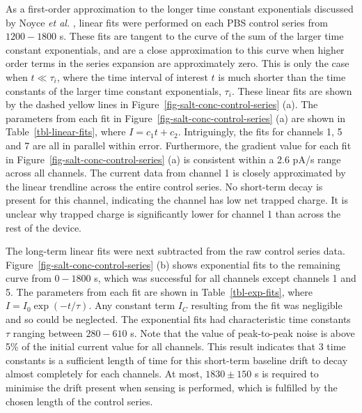 \documentclass[
  a4paper,
]{scrbook}
\begin{document}
As a first-order approximation to the longer time constant exponentials
discussed by Noyce \emph{et al.} \autocite{Noyce2019}, linear fits were
performed on each PBS control series from \(1200-1800\) s. These fits
are tangent to the curve of the sum of the larger time constant
exponentials, and are a close approximation to this curve when higher
order terms in the series expansion are approximately zero. This is only
the case when \(t\ll\tau_i\), where the time interval of interest \(t\)
is much shorter than the time constants of the larger time constant
exponentials, \(\tau_i\). These linear fits are shown by the dashed
yellow lines in Figure~\ref{fig-salt-conc-control-series} (a). The
parameters from each fit in Figure~\ref{fig-salt-conc-control-series}
(a) are shown in Table~\ref{tbl-linear-fits}, where \(I = c_1t + c_2\).
Intriguingly, the fits for channels 1, 5 and 7 are all in parallel
within error. Furthermore, the gradient value for each fit in
Figure~\ref{fig-salt-conc-control-series} (a) is consistent within a 2.6
pA/s range across all channels. The current data from channel 1 is
closely approximated by the linear trendline across the entire control
series. No short-term decay is present for this channel, indicating the
channel has low net trapped charge. It is unclear why trapped charge is
significantly lower for channel 1 than across the rest of the device.

The long-term linear fits were next subtracted from the raw control
series data. Figure~\ref{fig-salt-conc-control-series} (b) shows
exponential fits to the remaining curve from \(0-1800\) s, which was
successful for all channels except channels 1 and 5. The parameters from
each fit are shown in Table~\ref{tbl-exp-fits}, where
\(I = I_0\exp(-t/\tau)\). Any constant term \(I_C\) resulting from the
fit was negligible and so could be neglected. The exponential fits had
characteristic time constants \(\tau\) ranging between \(280 - 610\) s.
Note that the value of peak-to-peak noise is above 5\% of the initial
current value for all channels. This result indicates that 3 time
constants is a sufficient length of time for this short-term baseline
drift to decay almost completely for each channels. At most,
\(1830\pm150\) s is required to minimise the drift present when sensing
is performed, which is fulfilled by the chosen length of the control
series.
\end{document}
